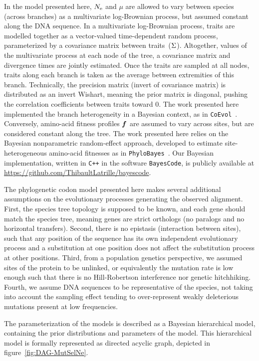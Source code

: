 In the model presented here, $N_{\text{e}}$ and $\mu$ are allowed to vary between species (across branches) as a multivariate log-Brownian process, but assumed constant along the \acrshort{DNA} sequence.
In a multivariate log-Brownian process, traits are modelled together as a vector-valued time-dependent random process, parameterized by a covariance matrix between traits~($\Sigma$).
Altogether, values of the multivariate process at each node of the tree, a covariance matrix and divergence times are jointly estimated.
Once the traits are sampled at all nodes, traits along each branch is taken as the average between extremities of this branch.
Technically, the precision matrix (invert of covariance matrix) is distributed as an invert Wishart, meaning the prior matrix is diagonal, pushing the correlation coefficients between traits toward $0$.
The work presented here implemented the branch heterogeneity in a Bayesian context, as in \texttt{CoEvol}~\citep{Lartillot2011}.
Conversely, amino-acid fitness profiles $\bm{f}$ are assumed to vary across sites, but are considered constant along the tree.
The work presented here relies on the Bayesian nonparametric random-effect approach, developed to estimate site-heterogeneous amino-acid fitnesses as in \texttt{PhyloBayes}~\citep{Rodrigue2010}.
Our Bayesian implementation, written in \texttt{C++} in the software \texttt{BayesCode}, is publicly available at \url{https://github.com/ThibaultLatrille/bayescode}.

The phylogenetic codon model presented here makes several additional assumptions on the evolutionary processes generating the observed alignment.
First, the species tree topology is supposed to be known, and each gene should match the species tree, meaning genes are strict orthologs (no paralogs and no horizontal transfers).
Second, there is no epistasis (interaction between sites), such that any position of the sequence has its own independent evolutionary process and a substitution at one position does not affect the substitution process at other positions.
Third, from a population genetics perspective, we assumed sites of the protein to be unlinked, or equivalently the mutation rate is low enough such that there is no Hill-Robertson interference nor genetic hitchhiking.
Fourth, we assume \acrshort{DNA} sequences to be representative of the species, not taking into account the sampling effect tending to over-represent weakly deleterious mutations present at low frequencies.

The parameterization of the models is described as a Bayesian hierarchical model, containing the prior distributions and parameters of the model.
This hierarchical model is formally represented as directed acyclic graph, depicted in figure~\ref{fig:DAG-MutSelNe}.

